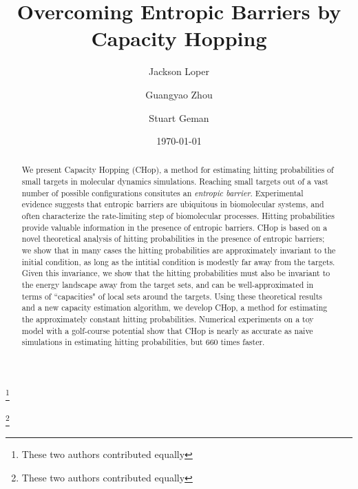 \documentclass[english, aip, jcp, priprint, graphicx,floatfix]{revtex4-1}
\theoremstyle{plain}
\theoremstyle{definition}
\theoremstyle{plain}
\begin{document}
\title{Overcoming Entropic Barriers by Capacity Hopping} %

\author{Jackson Loper}
\thanks{These two authors contributed equally}

\author{Guangyao Zhou}
\thanks{These two authors contributed equally}

\author{Stuart Geman}

\date{\today}

\begin{abstract}
	We present Capacity Hopping (CHop), a method for estimating hitting probabilities of small targets in molecular dynamics simulations. Reaching small targets out of a vast number of possible configurations consitutes an \emph{entropic barrier}. Experimental evidence suggests that entropic barriers are ubiquitous in biomolecular systems, and often characterize the rate-limiting step of biomolecular processes. Hitting probabilities provide valuable information in the presence of entropic barriers. CHop is based on a novel theoretical analysis of hitting probabilities in the presence of entropic barriers; we show that in many cases the hitting probabilities are approximately invariant to the initial condition, as long as the intitial condition is modestly far away from the targets.  Given this invariance, we show that the hitting probabilities must also be invariant to the energy landscape away from the target sets, and can be well-approximated in terms of ``capacities" of local sets around the targets.  Using these theoretical results and a new capacity estimation algorithm, we develop CHop, a method for estimating the approximately constant hitting probabilities. Numerical experiments on a toy model with a golf-course potential show that CHop is nearly as accurate as naive simulations in estimating hitting probabilities, but 660 times faster.
\end{abstract}

\pacs{}%

\maketitle %
\end{document}
